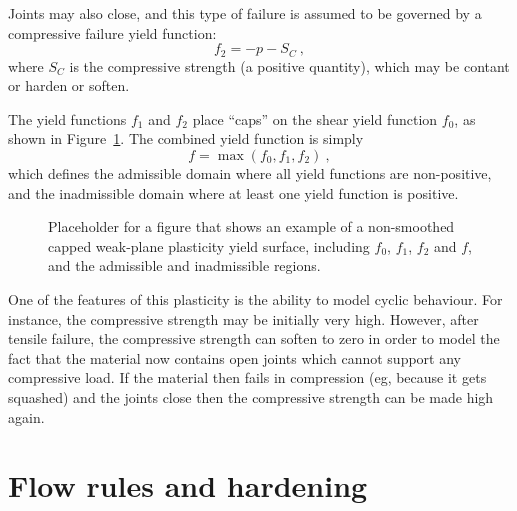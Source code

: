 \documentclass[]{scrreprt}
\begin{document}
Joints may also close, and this type of failure is assumed to be
governed by a compressive failure yield function:
\begin{equation}
f_{2} = - p - S_{C} \ ,
\end{equation}
where $S_{C}$ is the compressive strength (a positive quantity), which
may be contant or harden or soften.

The yield functions $f_{1}$ and $f_{2}$ place ``caps'' on the shear
yield function $f_{0}$, as shown in Figure~\ref{no_smoothing_eg.fig}.
The combined yield function is simply
\begin{equation}
f = \max(f_{0}, f_{1}, f_{2}) \ ,
\label{one.yf.eqn}
\end{equation}
which defines the admissible domain where all yield functions are
non-positive, and the inadmissible domain where at least one yield
function is positive.

\begin{figure}[htb]
\begin{center}
\caption{Placeholder for a figure that shows an example of a
  non-smoothed capped weak-plane plasticity yield surface, including
  $f_{0}$, $f_{1}$, $f_{2}$ and $f$, and the admissible and
  inadmissible regions.}
\label{no_smoothing_eg.fig}
\end{center}
\end{figure}

One of the features of this plasticity is the
ability to model cyclic behaviour.  For instance, the compressive
strength may be initially very high.  However, after tensile failure,
the compressive strength can soften to zero in order to model the fact
that the material now contains open joints which cannot support any
compressive load.  If the material then fails in compression (eg,
because it gets squashed) and the joints close then the compressive
strength can be made high again.

\chapter{Flow rules and hardening}
\end{document}
